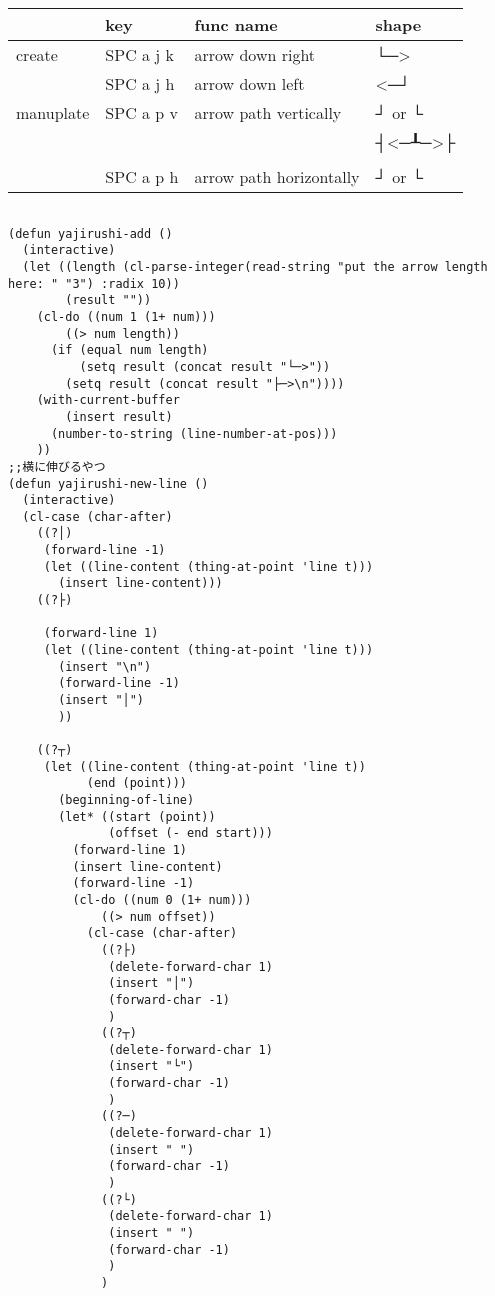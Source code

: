 \documentclass[11pt]{article}
\begin{document}
\begin{center}
\begin{tabular}{llll}
\hline
 & key & func name & shape\\
\hline
create & SPC a j k & arrow down right & └─>\\
 & SPC a j h & arrow down left & <─┘\\
\hline
manuplate & SPC a p v & arrow path vertically & ┘ or └\\
 &  &  & ┤<─┸─>├\\
 &  &  & \\
 & SPC a p h & arrow path horizontally & ┘ or └\\
\hline
\end{tabular}
\end{center}
\begin{verbatim}

(defun yajirushi-add ()
  (interactive)
  (let ((length (cl-parse-integer(read-string "put the arrow length here: " "3") :radix 10))
        (result ""))
    (cl-do ((num 1 (1+ num)))
        ((> num length))
      (if (equal num length)
          (setq result (concat result "└─>"))
        (setq result (concat result "├─>\n"))))
    (with-current-buffer
        (insert result)
      (number-to-string (line-number-at-pos)))
    ))
;;横に伸びるやつ
(defun yajirushi-new-line ()
  (interactive)
  (cl-case (char-after)
    ((?│)
     (forward-line -1)
     (let ((line-content (thing-at-point 'line t)))
       (insert line-content)))
    ((?├)

     (forward-line 1)
     (let ((line-content (thing-at-point 'line t)))
       (insert "\n")
       (forward-line -1)
       (insert "│")
       ))

    ((?┬)
     (let ((line-content (thing-at-point 'line t))
           (end (point)))
       (beginning-of-line)
       (let* ((start (point))
              (offset (- end start)))
         (forward-line 1)
         (insert line-content)
         (forward-line -1)
         (cl-do ((num 0 (1+ num)))
             ((> num offset))
           (cl-case (char-after)
             ((?├)
              (delete-forward-char 1)
              (insert "│")
              (forward-char -1)
              )
             ((?┬)
              (delete-forward-char 1)
              (insert "└")
              (forward-char -1)
              )
             ((?─)
              (delete-forward-char 1)
              (insert " ")
              (forward-char -1)
              )
             ((?└)
              (delete-forward-char 1)
              (insert " ")
              (forward-char -1)
              )
             )


\end{verbatim}
\end{document}
